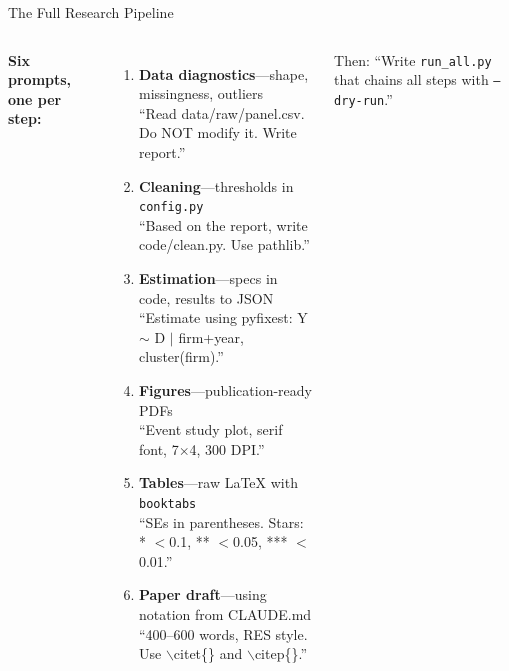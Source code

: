 \documentclass[aspectratio=169,10pt]{beamer}
\begin{document}
\begin{frame}[fragile]{The Full Research Pipeline}
\begin{columns}[T]
\vspace{0.3em}
\textbf{Six prompts, one per step:}
\begin{enumerate}\itemsep1pt
    \item[\textbf{1.}] \textbf{Data diagnostics}---shape, missingness, outliers\\
    {\scriptsize ``Read data/raw/panel.csv. Do NOT modify it. Write report.''}
    \item[\textbf{2.}] \textbf{Cleaning}---thresholds in \texttt{config.py}\\
    {\scriptsize ``Based on the report, write code/clean.py. Use pathlib.''}
    \item[\textbf{3.}] \textbf{Estimation}---specs in code, results to JSON\\
    {\scriptsize ``Estimate using pyfixest: Y $\sim$ D $|$ firm+year, cluster(firm).''}
    \item[\textbf{4.}] \textbf{Figures}---publication-ready PDFs\\
    {\scriptsize ``Event study plot, serif font, 7$\times$4, 300 DPI.''}
    \item[\textbf{5.}] \textbf{Tables}---raw LaTeX with \texttt{booktabs}\\
    {\scriptsize ``SEs in parentheses. Stars: * $<$0.1, ** $<$0.05, *** $<$0.01.''}
    \item[\textbf{6.}] \textbf{Paper draft}---using notation from CLAUDE.md\\
    {\scriptsize ``400--600 words, RES style. Use $\backslash$citet\{\} and $\backslash$citep\{\}.''}
\end{enumerate}

\vspace{0.2em}
{\scriptsize Then: ``Write \texttt{run\_all.py} that chains all steps with \texttt{--dry-run}.''}
\end{columns}
\end{frame}
\end{document}
